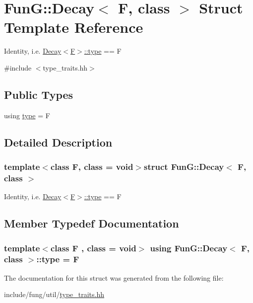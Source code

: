 \hypertarget{structFunG_1_1Decay}{\section{Fun\-G\-:\-:Decay$<$ F, class $>$ Struct Template Reference}
\label{structFunG_1_1Decay}
}


Identity, i.\-e. \hyperlink{structFunG_1_1Decay_a4b2916cbb7c8587ab3fccc9b896b9df4}{Decay$<$\-F$>$\-::type} == F  




{\ttfamily \#include $<$type\-\_\-traits.\-hh$>$}

\subsection*{Public Types}
\begin{DoxyCompactItemize}
\item 
using \hyperlink{structFunG_1_1Decay_a4b2916cbb7c8587ab3fccc9b896b9df4}{type} = F
\end{DoxyCompactItemize}


\subsection{Detailed Description}
\subsubsection*{template$<$class F, class = void$>$struct Fun\-G\-::\-Decay$<$ F, class $>$}

Identity, i.\-e. \hyperlink{structFunG_1_1Decay_a4b2916cbb7c8587ab3fccc9b896b9df4}{Decay$<$\-F$>$\-::type} == F 

\subsection{Member Typedef Documentation}
\hypertarget{structFunG_1_1Decay_a4b2916cbb7c8587ab3fccc9b896b9df4}{
\subsubsection[{type}]{\setlength{\rightskip}{0pt plus 5cm}template$<$class F , class  = void$>$ using {\bf Fun\-G\-::\-Decay}$<$ F, class $>$\-::{\bf type} =  F}}\label{structFunG_1_1Decay_a4b2916cbb7c8587ab3fccc9b896b9df4}


The documentation for this struct was generated from the following file\-:\begin{DoxyCompactItemize}
\item 
include/fung/util/\hyperlink{type__traits_8hh}{type\-\_\-traits.\-hh}\end{DoxyCompactItemize}

